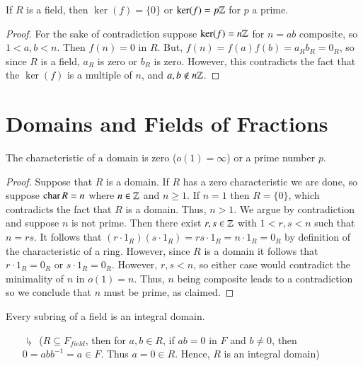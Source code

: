 \documentclass[12pt, a4paper, oneside, openright, titlepage]{book}
\begin{document}
\begin{prop}
        If $R$ is a field, then $\ker(f) = \{0\}$ or $\ker(f) = p\mathbb Z$ for $p$ a prime.
\end{prop}
\begin{proof}
        For the sake of contradiction suppose $\ker(f) = n\mathbb Z$ for $n = ab$ composite, so $1 < a,b < n$. Then $f(n) = 0$ in $R$. But, $f(n) = f(a)f(b) = a_Rb_R = 0_R$, so since $R$ is a field, $a_R$ is zero or $b_R$ is zero. However, this contradicts the fact that the $\ker(f)$ is a multiple of $n$, and $a,b \notin n\mathbb Z$.
\end{proof}





\section{\textsection Domains and Fields of Fractions}

\begin{prop}
    The characteristic of a domain is zero ($o(1) = \infty$) or a prime number $p$.
    \begin{proof}
        Suppose that $R$ is a domain. If $R$ has a zero characteristic we are done, so suppose $\operatorname{char} R = n$ where $n \in \mathbb Z$ and $n \geq 1$. If $n = 1$ then $R = \{0\}$, which contradicts the fact that $R$ is a domain. Thus, $n > 1$. We argue by contradiction and suppose $n$ is not prime. Then there exist $r,s \in \mathbb Z$ with $1 < r,s < n$ such that $n = rs$. It follows that $(r\cdot 1_R)(s\cdot 1_R) = rs\cdot 1_R = n\cdot 1_R = 0_R$ by definition of the characteristic of a ring. However, since $R$ is a domain it follows that $r\cdot 1_R = 0_R$ or $s \cdot 1_R = 0_R$. However, $r,s < n$, so either case would contradict the minimality of $n$ in $o(1) = n$. Thus, $n$ being composite leads to a contradiction so we conclude that $n$ must be prime, as claimed.
    \end{proof}
\end{prop}

\begin{rmk}
    Every subring of a field is an integral domain.
    \begin{enumerate}
        \item[$\drsh$] ($R\subseteq F_{field}$, then for $a,b \in R$, if $ab = 0$ in $F$ and $b \neq 0$, then $0 = abb^{-1} = a \in F$. Thus $a = 0 \in R$. Hence, $R$ is an integral domain)
    \end{enumerate}
\end{rmk}
\end{document}
